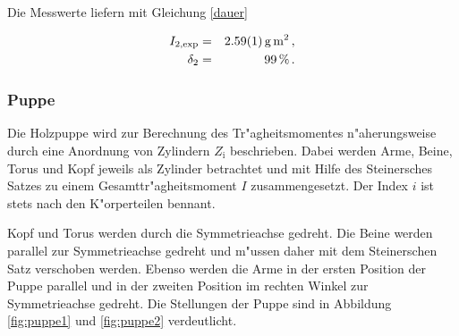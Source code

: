 				Die Messwerte liefern mit Gleichung \eqref{dauer}

				\begin{eqnarray*}
					I_\mathrm{2, exp} & = & \SI{2.59 (1)}{\gram \meter \squared} \,, \\
					\delta_2 & = & \SI{99}{\percent} \,.
				\end{eqnarray*}

			\clearpage
			\subsubsection{Puppe}
			\label{subsubsec:puppe}
				Die Holzpuppe wird zur Berechnung des Tr"agheitsmomentes n"aherungsweise durch eine Anordnung von Zylindern $Z_\mathrm{i}$ beschrieben.
				Dabei werden Arme, Beine, Torus und Kopf jeweils als Zylinder betrachtet und mit Hilfe des Steinersches Satzes zu einem Gesamttr"agheitsmoment $I$ zusammengesetzt.
				Der Index $i$ ist stets nach den K"orperteilen bennant.

				Kopf und Torus werden durch die Symmetrieachse gedreht.
				Die Beine werden parallel zur Symmetrieachse gedreht und m"ussen daher mit dem Steinerschen Satz verschoben werden.
				Ebenso werden die Arme in der ersten Position der Puppe parallel und in der zweiten Position im rechten Winkel zur Symmetrieachse gedreht. Die Stellungen der Puppe sind in Abbildung \ref{fig:puppe1} und \ref{fig:puppe2} verdeutlicht.


